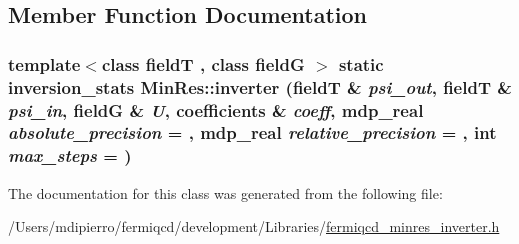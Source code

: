 \subsection{Member Function Documentation}
\hypertarget{class_min_res_ac42d7344449126a5aa109222de0ef527}{
\subsubsection[{inverter}]{\setlength{\rightskip}{0pt plus 5cm}template$<$class fieldT , class fieldG $>$ static {\bf inversion\_\-stats} MinRes::inverter (fieldT \& {\em psi\_\-out}, \/  fieldT \& {\em psi\_\-in}, \/  fieldG \& {\em U}, \/  {\bf coefficients} \& {\em coeff}, \/  {\bf mdp\_\-real} {\em absolute\_\-precision} = {}, \/  {\bf mdp\_\-real} {\em relative\_\-precision} = {}, \/  int {\em max\_\-steps} = {})}}
\label{class_min_res_ac42d7344449126a5aa109222de0ef527}


The documentation for this class was generated from the following file:\begin{DoxyCompactItemize}
\item 
/Users/mdipierro/fermiqcd/development/Libraries/\hyperlink{fermiqcd__minres__inverter_8h}{fermiqcd\_\-minres\_\-inverter.h}\end{DoxyCompactItemize}
